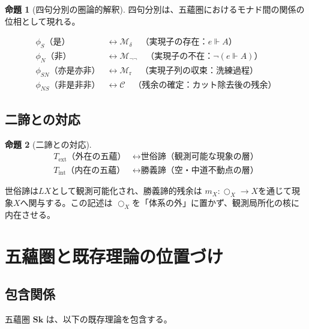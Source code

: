 \documentclass[11pt,a4paper]{ltjsarticle}
\theoremstyle{definition}
\newtheorem{proposition}{命題}[section]
\newcommand{\Sk}{\mathbf{Sk}}
\newcommand{\Mdelta}{\mathcal{M}_{\delta}}
\newcommand{\Mneg}{\mathcal{M}_{\neg\neg}}
\newcommand{\Mr}{\mathcal{M}_{\mathrm{r}}}
\newcommand{\Mc}{\mathcal{C}}
\newcommand{\ext}{\mathrm{ext}}
\newcommand{\intn}{\mathrm{int}}
\newcommand{\TExt}{T_{\ext}}
\newcommand{\TInt}{T_{\intn}}
\begin{document}
\begin{proposition}[四句分別の圏論的解釈]
四句分別は、五蘊圏におけるモナド間の関係の位相として現れる。

\begin{align}
\phi_S \text{（是）} &\longleftrightarrow \Mdelta 
\quad \text{（実現子の存在：} e \Vdash A \text{）} \\
\phi_N \text{（非）} &\longleftrightarrow \Mneg 
\quad \text{（実現子の不在：} \neg(e \Vdash A) \text{）} \\
\phi_{SN} \text{（亦是亦非）} &\longleftrightarrow \Mr 
\quad \text{（実現子列の収束：洗練過程）} \\
\phi_{NS} \text{（非是非非）} &\longleftrightarrow \Mc 
\quad \text{（残余の確定：カット除去後の残余）}
\end{align}
\end{proposition}

\subsection{二諦との対応}

\begin{proposition}[二諦との対応]
\begin{align}
\TExt \text{（外在の五蘊）} &\longleftrightarrow 
\text{世俗諦（観測可能な現象の層）} \\
\TInt \text{（内在の五蘊）} &\longleftrightarrow 
\text{勝義諦（空・中道不動点の層）}
\end{align}

世俗諦は$LX$として観測可能化され、勝義諦的残余は
$m_X:\bigcirc_X\to X$を通じて現象$X$へ関与する。この記述は
$\bigcirc_X$を「体系の外」に置かず、観測局所化の核に内在させる。
\end{proposition}

\section{五蘊圏と既存理論の位置づけ}

\subsection{包含関係}

五蘊圏 $\Sk$ は、以下の既存理論を包含する。
\end{document}
